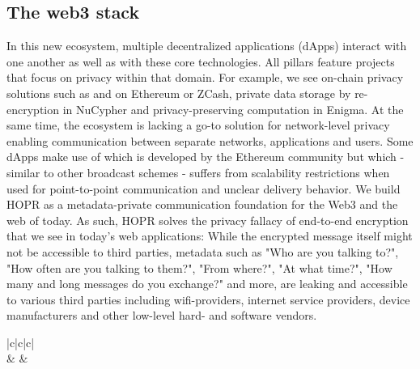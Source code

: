 \subsection{The web3 stack}
In this new ecosystem, multiple decentralized applications (dApps) interact with one another as well as with these core technologies. All pillars feature projects that focus on privacy within that domain. For example, we see on-chain privacy solutions such as  and  on Ethereum or ZCash, private data storage by re-encryption in NuCypher and privacy-preserving computation in Enigma. At the same time, the ecosystem is lacking a go-to solution for network-level privacy enabling communication between separate networks, applications and users. Some dApps make use of  which is developed by the Ethereum community but which - similar to other broadcast schemes - suffers from scalability restrictions when used for point-to-point communication and unclear delivery behavior. We build HOPR as a metadata-private communication foundation for the Web3 and the web of today. As such, HOPR solves the privacy fallacy of end-to-end encryption that we see in today's web applications: While the encrypted  message itself might not be accessible to third parties, metadata such as "Who are you talking to?", "How often are you talking to them?", "From where?", "At what time?", "How many and long messages do you exchange?" and more, are leaking and accessible to various third parties including wifi-providers, internet service providers, device manufacturers and other low-level hard- and software vendors.

\setlength{\tabcolsep}{1em} %
{\renewcommand{\arraystretch}{2}%
\begin{center}
    \begin{tabular}{|c|c|c|}
        \hline
         \\
        \hline
         &  & \\
        \hline
         \\
        \hline
    \end{tabular}
\end{center}
}

